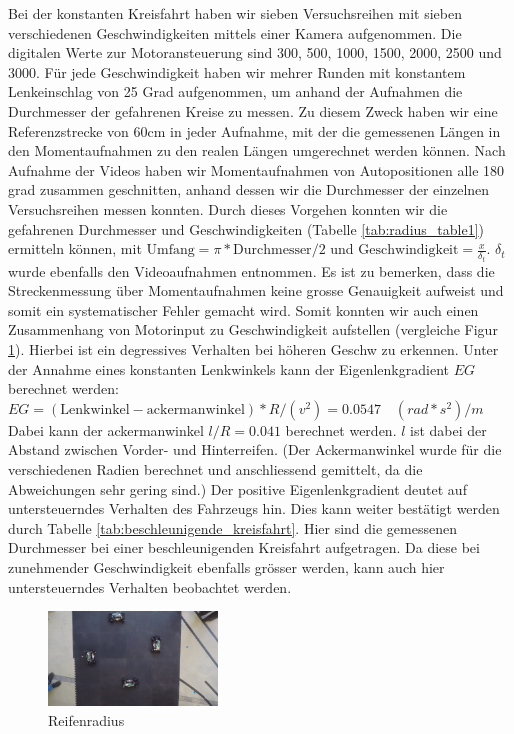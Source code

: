 \documentclass[10pt]{article}
\begin{document}
    Bei der konstanten Kreisfahrt haben wir sieben Versuchsreihen mit sieben verschiedenen Geschwindigkeiten mittels einer Kamera aufgenommen.
    Die digitalen Werte zur Motoransteuerung sind 300, 500, 1000, 1500, 2000, 2500 und 3000.
    Für jede Geschwindigkeit haben wir mehrer Runden mit konstantem Lenkeinschlag von 25 Grad aufgenommen, um anhand der Aufnahmen die Durchmesser der gefahrenen Kreise zu messen.
    Zu diesem Zweck haben wir eine Referenzstrecke von 60cm in jeder Aufnahme, mit der die gemessenen Längen in den Momentaufnahmen zu den
    realen Längen umgerechnet werden können. Nach Aufnahme der Videos haben wir Momentaufnahmen von Autopositionen alle 180 grad zusammen geschnitten,
    anhand dessen wir die Durchmesser der einzelnen Versuchsreihen messen konnten. Durch dieses Vorgehen konnten wir die gefahrenen Durchmesser und Geschwindigkeiten (Tabelle \ref{tab:radius_table1}) ermitteln können, mit $\text{Umfang} = \pi*\text{Durchmesser}/2$ und $\text{Geschwindigkeit} = \frac{x}{\delta_t}$. $\delta_t$ wurde ebenfalls den Videoaufnahmen entnommen.
    Es ist zu bemerken, dass die Streckenmessung über Momentaufnahmen keine grosse Genauigkeit aufweist und somit ein systematischer Fehler gemacht wird.
    Somit konnten wir auch einen Zusammenhang von Motorinput zu Geschwindigkeit aufstellen (vergleiche Figur \ref{fig:reifenradius}). Hierbei ist ein degressives Verhalten bei höheren Geschw zu erkennen.
    Unter der Annahme eines konstanten Lenkwinkels kann der Eigenlenkgradient $EG$ berechnet werden:
    $EG=(\text{Lenkwinkel}-\text{ackermanwinkel})*R/(v^2)=0.0547\quad (rad*s^2)/m$
    Dabei kann der ackermanwinkel  $l/R = 0.041$ berechnet werden. $l$ ist dabei der Abstand zwischen Vorder- und Hinterreifen.
    (Der Ackermanwinkel wurde für die verschiedenen Radien berechnet und anschliessend gemittelt, da die Abweichungen sehr gering sind.)
    Der positive Eigenlenkgradient deutet auf untersteuerndes Verhalten des Fahrzeugs hin. Dies kann weiter bestätigt werden durch Tabelle \ref{tab:beschleunigende_kreisfahrt}.
    Hier sind die gemessenen Durchmesser bei einer beschleunigenden Kreisfahrt aufgetragen. Da diese bei zunehmender Geschwindigkeit ebenfalls grösser werden, kann auch hier untersteuerndes Verhalten beobachtet werden.


\begin{figure}[hbtp]
        \centering
        \includegraphics[width=0.4\textwidth]{Dyn_Kreis_5678}
        \caption{Reifenradius}
        \label{fig:reifenradius}
    \end{figure}
\end{document}
